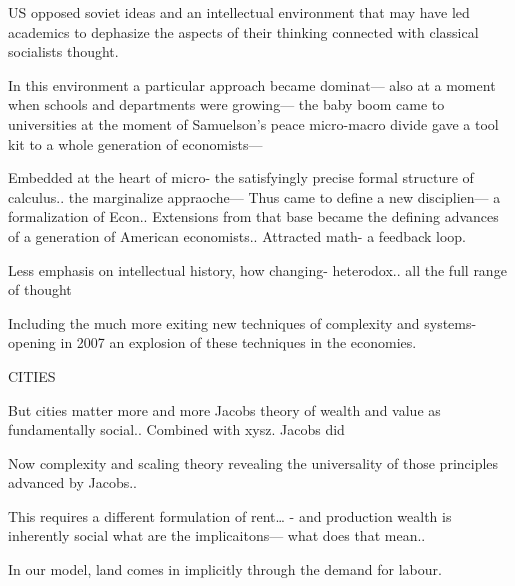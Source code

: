 US opposed soviet ideas and an intellectual environment that may have led academics to dephasize the aspects of their thinking connected with classical socialists thought. 

In this environment a particular approach became dominat— also at a moment when schools and departments were growing— the baby boom came to universities at the moment of Samuelson’s peace micro-macro divide gave a tool kit to a whole generation of economists— 

Embedded at the heart of micro- the satisfyingly precise formal structure of calculus.. the marginalize appraoche— 
Thus came to define a new disciplien— a formalization of Econ.. 
Extensions from that base became the defining advances of a generation of American economists..
Attracted math- a feedback loop.

Less emphasis on intellectual history, how changing- heterodox.. all the full range of thought

Including the much more exiting new techniques of complexity and systems- opening in 2007 an explosion of these techniques in the economies. 


CITIES

But cities matter more and more
Jacobs theory of wealth and value as fundamentally social.. 
Combined with xysz. Jacobs did

Now complexity and scaling theory revealing the universality of those principles advanced by Jacobs..

This requires a different formulation of rent… - and production wealth is inherently social what are the implicaitons— what does that mean.. 



In our model, land comes in implicitly through the demand for labour. 



